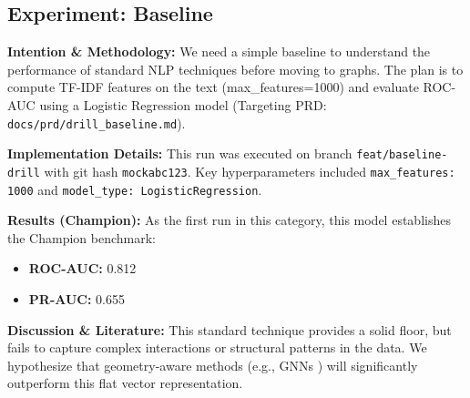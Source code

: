 \subsection{Experiment: Baseline}
\label{sec:exp_baseline}

\textbf{Intention \& Methodology:} 
We need a simple baseline to understand the performance of standard NLP techniques before moving to graphs. The plan is to compute TF-IDF features on the text (max\_features=1000) and evaluate ROC-AUC using a Logistic Regression model (Targeting PRD: \texttt{docs/prd/drill\_baseline.md}).

\textbf{Implementation Details:}
This run was executed on branch \texttt{feat/baseline-drill} with git hash \texttt{mockabc123}. Key hyperparameters included \texttt{max\_features: 1000} and \texttt{model\_type: LogisticRegression}.

\textbf{Results (Champion):}
As the first run in this category, this model establishes the Champion benchmark:
\begin{itemize}
    \item \textbf{ROC-AUC:} 0.812
    \item \textbf{PR-AUC:} 0.655
\end{itemize}

\textbf{Discussion \& Literature:}
This standard technique provides a solid floor, but fails to capture complex interactions or structural patterns in the data. We hypothesize that geometry-aware methods (e.g., GNNs \cite{velickovic2018graph}) will significantly outperform this flat vector representation.
